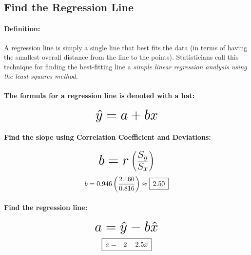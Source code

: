 \documentclass[12pt]{article}
\newcommand{\padBox}[1]{{\setlength\fboxsep{5pt}\boxed{#1}}}
\newcommand*{\mH}[1]{\mbox{\huge$#1$}}
\begin{document}
\subsection{Find the Regression Line}
\paragraph{Definition:}
A regression line is simply a single line that best fits the data (in terms of having the smallest overall distance from the line to the points). Statisticians call this technique for finding the best-fitting line a \emph{simple linear regression analysis using the least squares method.}

\paragraph{The formula for a regression line is denoted with a hat:}
\begin{equation}
	\mH{\hat{y} = a + bx}
\end{equation}

\paragraph{Find the slope using Correlation Coefficient and Deviations:}
\begin{equation}
	\mH{b = r\left(\frac{S_{y}}{S_{x}}\right)}
\end{equation}
\begin{equation}
	b = 0.946\left(\frac{2.160}{0.816}\right) \approx \padBox{2.50}
\end{equation}

\paragraph{Find the regression line:}
\begin{equation}
	\mH{a = \hat{y} -b\hat{x} }
\end{equation}
\begin{equation}
	\padBox{a = -2 - 2.5x}
\end{equation}
\end{document}
